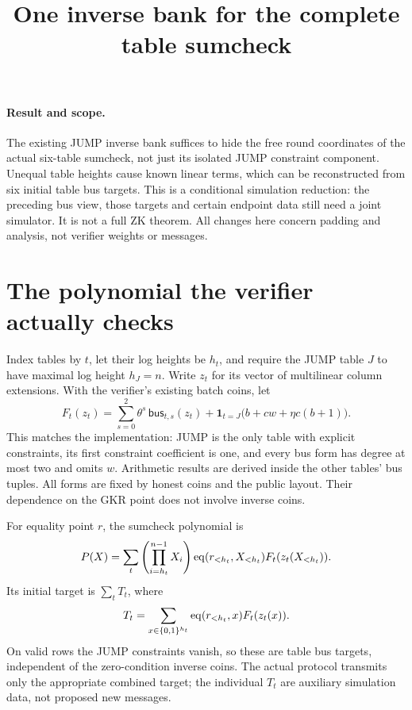 \documentclass[11pt]{article}
\title{One inverse bank for the complete table sumcheck}
\author{}
\date{}
\begin{document}
\maketitle
\vspace{-2em}

\paragraph{Result and scope.} The existing JUMP inverse bank suffices to hide the free round coordinates of the actual six-table sumcheck, not just its isolated JUMP constraint component. Unequal table heights cause known linear terms, which can be reconstructed from six initial table bus targets. This is a conditional simulation reduction: the preceding bus view, those targets and certain endpoint data still need a joint simulator. It is not a full ZK theorem. All changes here concern padding and analysis, not verifier weights or messages.

\section{The polynomial the verifier actually checks}

Index tables by $t$, let their log heights be $h_t$, and require the JUMP table $J$ to have maximal log height $h_J=n$. Write $z_t$ for its vector of multilinear column extensions. With the verifier's existing batch coins, let
\[
 F_t(z_t)=\sum_{s=0}^2\theta^s\,\mathsf{bus}_{t,s}(z_t)
 +\mathbf1_{t=J}\bigl(b+cw+\eta c(b+1)\bigr).
\]
This matches the implementation: JUMP is the only table with explicit constraints, its first constraint coefficient is one, and every bus form has degree at most two and omits $w$. Arithmetic results are derived inside the other tables' bus tuples. All forms are fixed by honest coins and the public layout. Their dependence on the GKR point does not involve inverse coins.

For equality point $r$, the sumcheck polynomial is
\begin{equation}\label{eq:batch-poly}
 P(X)=\sum_t\left(\prod_{i=h_t}^{n-1}X_i\right)
 \operatorname{eq}(r_{<h_t},X_{<h_t})F_t(z_t(X_{<h_t})).
\end{equation}
Its initial target is $\sum_t T_t$, where
\[
 T_t=\sum_{x\in\{0,1\}^{h_t}}\operatorname{eq}(r_{<h_t},x)F_t(z_t(x)).
\]
On valid rows the JUMP constraints vanish, so these are table bus targets, independent of the zero-condition inverse coins. The actual protocol transmits only the appropriate combined target; the individual $T_t$ are auxiliary simulation data, not proposed new messages.
\end{document}
